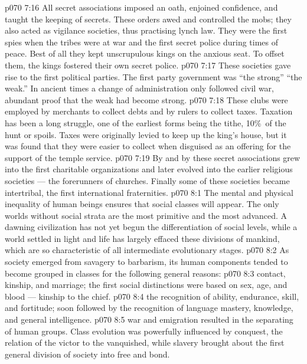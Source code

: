 \vs p070 7:16 All secret associations imposed an oath, enjoined confidence, and taught the keeping of secrets. These orders awed and controlled the mobs; they also acted as vigilance societies, thus practising lynch law. They were the first spies when the tribes were at war and the first secret police during times of peace. Best of all they kept unscrupulous kings on the anxious seat. To offset them, the kings fostered their own secret police.
\vs p070 7:17 These societies gave rise to the first political parties. The first party government was “the strong”  “the weak.” In ancient times a change of administration only followed civil war, abundant proof that the weak had become strong.
\vs p070 7:18 These clubs were employed by merchants to collect debts and by rulers to collect taxes. Taxation has been a long struggle, one of the earliest forms being the tithe, 10\%\ of the hunt or spoils. Taxes were originally levied to keep up the king’s house, but it was found that they were easier to collect when disguised as an offering for the support of the temple service.
\vs p070 7:19 By and by these secret associations grew into the first charitable organizations and later evolved into the earlier religious societies --- the forerunners of churches. Finally some of these societies became intertribal, the first international fraternities.
\vs p070 8:1 The mental and physical inequality of human beings ensures that social classes will appear. The only worlds without social strata are the most primitive and the most advanced. A dawning civilization has not yet begun the differentiation of social levels, while a world settled in light and life has largely effaced these divisions of mankind, which are so characteristic of all intermediate evolutionary stages.
\vs p070 8:2 As society emerged from savagery to barbarism, its human components tended to become grouped in classes for the following general reasons:
\vs p070 8:3 \bibnobreakspace {} contact, kinship, and marriage; the first social distinctions were based on sex, age, and blood --- kinship to the chief.
\vs p070 8:4 \bibnobreakspace {} the recognition of ability, endurance, skill, and fortitude; soon followed by the recognition of language mastery, knowledge, and general intelligence.
\vs p070 8:5 \bibnobreakspace {} war and emigration resulted in the separating of human groups. Class evolution was powerfully influenced by conquest, the relation of the victor to the vanquished, while slavery brought about the first general division of society into free and bond.
